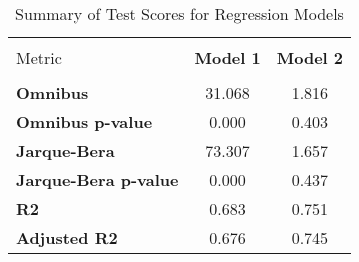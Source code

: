 
    \begin{table}
        \centering
        \caption{Summary of Test Scores for Regression Models}
        \vspace{10pt}
        \label{tab:test_scores}
        \begin{tabular}{lcc}
        \hline
        \hline \\[-1.8ex]
    Metric & \textbf{Model 1} & \textbf{Model 2} \\
\hline \\[-1.8ex] 
\textbf{Omnibus} & 31.068 & 1.816 \\
\textbf{Omnibus p-value} & 0.000 & 0.403 \\
\textbf{Jarque-Bera} & 73.307 & 1.657 \\
\textbf{Jarque-Bera p-value} & 0.000 & 0.437 \\
\textbf{R2} & 0.683 & 0.751 \\
\textbf{Adjusted R2} & 0.676 & 0.745 \\

        \hline
        \hline
        \end{tabular}
    \end{table}
    